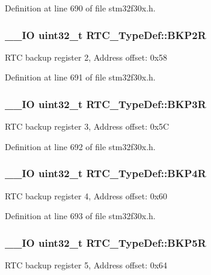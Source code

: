 Definition at line 690 of file stm32f30x.\-h.

\hypertarget{struct_r_t_c___type_def_aa845c401b24d2ef1049f489f26d35626}{
\subsubsection[{B\-K\-P2\-R}]{\setlength{\rightskip}{0pt plus 5cm}\-\_\-\-\_\-\-I\-O {\bf uint32\-\_\-t} R\-T\-C\-\_\-\-Type\-Def\-::\-B\-K\-P2\-R}}\label{struct_r_t_c___type_def_aa845c401b24d2ef1049f489f26d35626}
R\-T\-C backup register 2, Address offset\-: 0x58 

Definition at line 691 of file stm32f30x.\-h.

\hypertarget{struct_r_t_c___type_def_ac3802c3b17482a0667fb34ddd1863434}{
\subsubsection[{B\-K\-P3\-R}]{\setlength{\rightskip}{0pt plus 5cm}\-\_\-\-\_\-\-I\-O {\bf uint32\-\_\-t} R\-T\-C\-\_\-\-Type\-Def\-::\-B\-K\-P3\-R}}\label{struct_r_t_c___type_def_ac3802c3b17482a0667fb34ddd1863434}
R\-T\-C backup register 3, Address offset\-: 0x5\-C 

Definition at line 692 of file stm32f30x.\-h.

\hypertarget{struct_r_t_c___type_def_a6131b2f2896c122cf223206e4cfd2bd0}{
\subsubsection[{B\-K\-P4\-R}]{\setlength{\rightskip}{0pt plus 5cm}\-\_\-\-\_\-\-I\-O {\bf uint32\-\_\-t} R\-T\-C\-\_\-\-Type\-Def\-::\-B\-K\-P4\-R}}\label{struct_r_t_c___type_def_a6131b2f2896c122cf223206e4cfd2bd0}
R\-T\-C backup register 4, Address offset\-: 0x60 

Definition at line 693 of file stm32f30x.\-h.

\hypertarget{struct_r_t_c___type_def_a0f3a33de81247ec5729e400a1261f917}{
\subsubsection[{B\-K\-P5\-R}]{\setlength{\rightskip}{0pt plus 5cm}\-\_\-\-\_\-\-I\-O {\bf uint32\-\_\-t} R\-T\-C\-\_\-\-Type\-Def\-::\-B\-K\-P5\-R}}\label{struct_r_t_c___type_def_a0f3a33de81247ec5729e400a1261f917}
R\-T\-C backup register 5, Address offset\-: 0x64 

